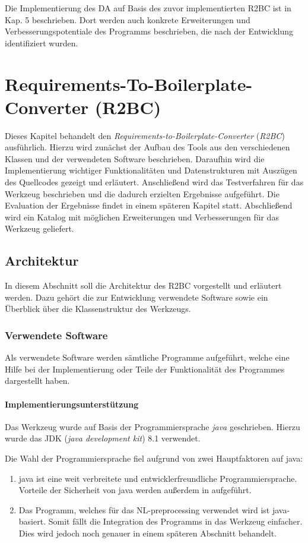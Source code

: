 \documentclass[12pt]{report}
\begin{document}
Die Implementierung des DA auf Basis des zuvor implementierten R2BC ist in Kap. 5 beschrieben. Dort werden auch konkrete Erweiterungen und Verbesserungspotentiale des Programms beschrieben, die nach der Entwicklung identifiziert wurden.

\chapter{Requirements-To-Boilerplate-Converter (R2BC)}
Dieses Kapitel behandelt den \textit{Requirements-to-Boilerplate-Converter} (\textit{R2BC}) ausführlich. Hierzu wird zunächst der Aufbau des Tools aus den verschiedenen Klassen und der verwendeten Software beschrieben. Daraufhin wird die Implementierung wichtiger Funktionalitäten und Datenstrukturen mit Auszügen des Quellcodes gezeigt und erläutert. Anschließend wird das Testverfahren für das Werkzeug beschrieben und die dadurch erzielten Ergebnisse aufgeführt. Die Evaluation der Ergebnisse findet in einem späteren Kapitel statt. Abschließend wird ein Katalog mit möglichen Erweiterungen und Verbesserungen für das Werkzeug geliefert. 

\section{Architektur}
In diesem Abschnitt soll die Architektur des R2BC vorgestellt und erläutert werden. Dazu gehört die zur Entwicklung verwendete Software sowie ein Überblick über die Klassenstruktur des Werkzeugs. 

\subsection{Verwendete Software}
Als verwendete Software werden sämtliche Programme aufgeführt, welche eine Hilfe bei der Implementierung oder Teile der Funktionalität des Programmes dargestellt haben. 

\subsubsection{Implementierungsunterstützung}
Das Werkzeug wurde auf Basis der Programmiersprache \textit{java} geschrieben. Hierzu wurde das JDK (\textit{java development kit}) 8.1 verwendet. 

Die Wahl der Programmiersprache fiel aufgrund von zwei Hauptfaktoren auf java: 
\begin{enumerate}
\item java ist eine weit verbreitete und entwicklerfreundliche Programmiersprache. Vorteile der Sicherheit von java werden außerdem in \cite{rs18} aufgeführt.
\item Das Programm, welches für das NL-preprocessing verwendet wird ist java-basiert. Somit fällt die Integration des Programms in das Werkzeug einfacher. Dies wird jedoch noch genauer in einem späteren Abschnitt behandelt.
\end{enumerate}
\end{document}
